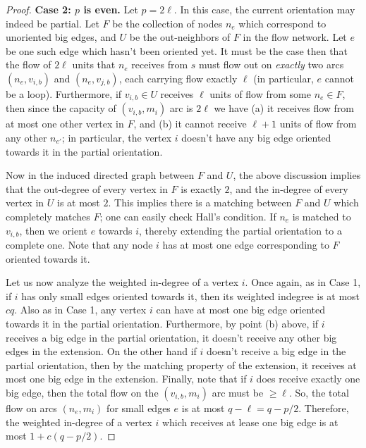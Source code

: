 \documentclass[11pt]{article}
\begin{document}
\begin{proof}
\noindent
	{\bf Case 2: $p$ is even.} Let $p=2\ell$. In this case, the current orientation may indeed be partial.
	Let $F$ be the collection of nodes $n_e$ which correspond to unoriented big edges, and $U$ be the out-neighbors of $F$ in the flow network. 
	Let $e$ be one such edge which hasn't been oriented yet. It must be the case then that the flow of $2\ell$ units that $n_e$ receives from $s$ must flow out 
	on {\em exactly} two arcs $(n_e,v_{i,b})$ and $(n_e,v_{j,b})$, each carrying flow exactly $\ell$ (in particular, $e$ cannot be a loop).
	Furthermore, if $v_{i,b}\in U$ receives $\ell$ units of flow from some $n_e \in F$, then since the capacity of $(v_{i,b},m_i)$ arc is $2\ell$ we have (a) it receives flow from at most one other vertex in $F$,
	and (b)	it cannot receive $\ell+1$ units of flow from any other $n_{e'}$; in particular, the vertex $i$ doesn't have any big edge oriented towards it in the partial orientation.
	
	Now in the induced directed graph between $F$ and $U$, the above discussion implies that the out-degree of every vertex in $F$ is exactly $2$, and the in-degree of every vertex in $U$ is at most $2$.
	This implies there is a matching between $F$ and $U$ which completely matches $F$; one can easily check Hall's condition. If $n_e$ is matched to $v_{i,b}$, then we orient $e$ towards $i$, thereby extending the partial orientation to a complete one. Note that any node $i$ has at most one edge corresponding to $F$ oriented towards it.
	
	Let us now analyze the weighted in-degree of a vertex $i$. Once again, as in Case 1, if $i$ has only small edges oriented towards it, then its weighted indegree is at most $c q$.
	Also as in Case 1, any vertex $i$ can have at most one big edge oriented towards it in the partial orientation. 
Furthermore, by point (b) above, if $i$ receives a big edge in the partial orientation, it doesn't receive any other big edges in the extension.
    On the other hand if $i$ doesn't receive a big edge in the partial orientation, then by the matching property of the extension, it receives at most one big edge in the extension.
    Finally, note that if $i$ does receive exactly one big edge, then the total flow on the $(v_{i,b},m_i)$ arc must be $\geq \ell$. So, the total flow on arcs $(n_e,m_i)$ for small edges $e$ is at most $q - \ell = q-p/2$. Therefore, the weighted in-degree of a vertex $i$ which receives at lease one big edge is at most $1 + c(q-p/2)$.
\end{proof}
\end{document}
